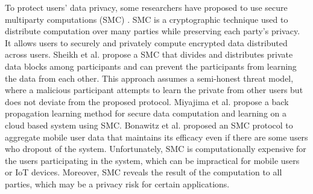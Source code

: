 \documentclass[letterpaper]{article}
\begin{document}
\begin{flushleft}
{%

To protect users' data privacy, some researchers have proposed to use secure multiparty computations (SMC) 
\cite{vaidya2003leveraging,7040943, ma2018privacy}. 
SMC is a cryptographic technique used to distribute computation over many parties while preserving each party's privacy. It allows
users to securely and privately compute encrypted data distributed across users. 
Sheikh et al. \cite{sheikh2010distributed} propose a SMC that divides and distributes private data blocks among participants and can
prevent the participants from learning the data from  each other. This approach assumes a semi-honest threat model,
where a malicious  participant attempts to learn the private from other users but does not deviate from the proposed
protocol. 
Miyajima et al. \cite{miyajima2016new} propose a back propagation learning method for secure data computation and learning on a cloud
based system using SMC. %
Bonawitz et al. \cite{bonawitz2017practical}  proposed an SMC protocol to aggregate mobile user data that maintains its efficacy even
if there are some users who dropout of the system.  Unfortunately, SMC is computationally expensive for the users participating in the
system, which can be impractical for mobile users or IoT devices. Moreover, SMC reveals the result of the computation to all parties,
which may be a privacy risk for certain applications. 


}
\end{flushleft}
\end{document}
